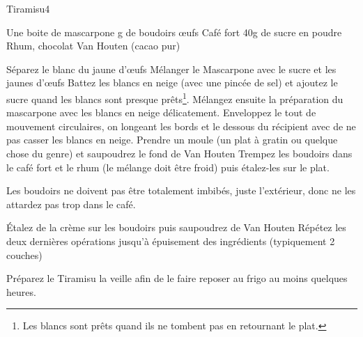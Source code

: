 \begin{recette}{Tiramisu}{4}{}{}
\begin{ingredients}
\ingredient Une boite de mascarpone
 g de boudoirs
 œufs
\ingredient Café fort
\ingredient 40g de sucre en poudre
\ingredient Rhum, chocolat Van Houten (cacao pur)
\end{ingredients}

\begin{preparation}
\etape Séparez le blanc du jaune d'œufs
\etape Mélanger le Mascarpone avec le sucre et les jaunes d'œufs
\etape Battez les blancs en neige (avec une pincée de sel) et ajoutez le sucre quand les blancs sont presque prêts\footnote{Les blancs sont prêts quand ils ne tombent pas en retournant le plat.}.
\etape Mélangez ensuite la préparation du mascarpone avec les blancs en neige délicatement. Enveloppez le tout de mouvement circulaires, on longeant les bords et le dessous du récipient avec de ne pas casser les blancs en neige.
\etape Prendre un moule (un plat à gratin ou quelque chose du genre) et saupoudrez le fond de Van Houten
\etape Trempez les boudoirs dans le café fort et le rhum (le mélange doit être froid) puis étalez-les sur le plat.
\begin{remarque}
Les boudoirs ne doivent pas être totalement imbibés, juste l'extérieur, donc ne les attardez pas trop dans le café.
\end{remarque}
\etape Étalez de la crème sur les boudoirs puis saupoudrez de Van Houten
\etape Répétez les deux dernières opérations jusqu'à épuisement des ingrédients (typiquement 2 couches)
\end{preparation}

\begin{remarque}
Préparez le Tiramisu la veille afin de le faire reposer au frigo au moins quelques heures.
\end{remarque}
\end{recette}
